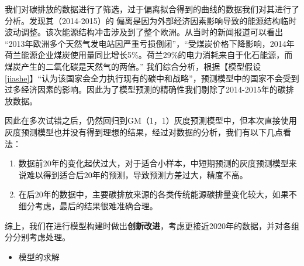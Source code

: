 \documentclass[bwprint]{gmcmthesis}
\numberwithin{figure}{section}
\begin{document}
我们对碳排放的数据进行了筛选，过于偏离拟合得到的曲线的数据我们对其进行了分析。发现其（2014-2015）的
偏离是因为外部经济因素影响导致的能源结构临时波动调整。该次能源结构冲击涉及到了整个欧洲。从当时的新闻报道可以看出
“2013年欧洲多个天然气发电站因严重亏损倒闭”，“受煤炭价格下降影响，2014年荷兰能源企业煤炭使用量同比增长5\%。荷兰29\%的电力消耗来自于化石能源，而煤炭产生的二氧化碳是天然气的两倍。”
我们综合分析，根据【模型假设\ref{jiashe}】“认为该国家会全力执行现有的碳中和战略”，预测模型中的国家不会受到过多经济因素的影响。因此为了模型预测的精确性我们剔除了2014-2015年的碳排放数据。

因此在多次试错之后，仍然回归到GM（1，1）灰度预测模型中，但本次直接使用灰度预测模型也并没有得到理想的结果，经过对数据的分析，我们有以下几点看法：
\begin{enumerate}
	\item 数据前20年的变化起伏过大，对于适合小样本，中短期预测的灰度预测模型来说难以得到适合后20年的预测，导致预测方差过大，精度不高。
	\item 在后20年的数据中，主要碳排放来源的各类传统能源碳排量变化较大，如果不细分考虑，最后的结果很难准确合理。
	\end{enumerate}

综上，我们在进行模型构建时做出\textbf{创新改进}，考虑更接近2020年的数据，并对各组分分别考虑处理。

\begin{itemize}
	\item 模型的求解
\end{itemize}
\end{document}
